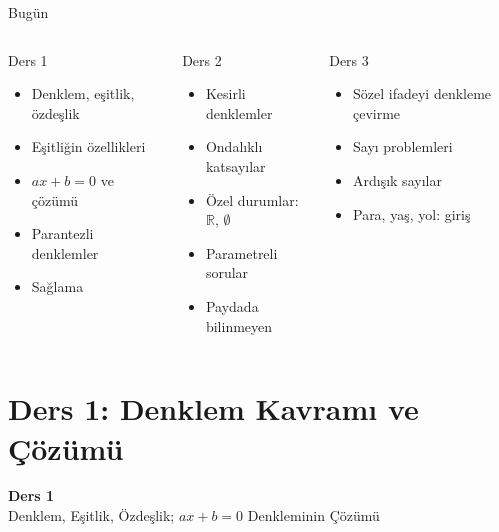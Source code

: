 \documentclass[aspectratio=169,11pt]{beamer}
\begin{document}
\begin{frame}{Bugün}
\begin{columns}[t]
\begin{block}{Ders 1}
\begin{itemize}
\item Denklem, eşitlik, özdeşlik
\item Eşitliğin özellikleri
\item \(ax+b=0\) ve çözümü
\item Parantezli denklemler
\item Sağlama
\end{itemize}
\end{block}
\begin{block}{Ders 2}
\begin{itemize}
\item Kesirli denklemler
\item Ondalıklı katsayılar
\item Özel durumlar: \(\mathbb{R}\), \(\emptyset\)
\item Parametreli sorular
\item Paydada bilinmeyen
\end{itemize}
\end{block}
\begin{block}{Ders 3}
\begin{itemize}
\item Sözel ifadeyi denkleme çevirme
\item Sayı problemleri
\item Ardışık sayılar
\item Para, yaş, yol: giriş
\end{itemize}
\end{block}
\end{columns}
\end{frame}

\section{Ders 1: Denklem Kavramı ve Çözümü}
\begin{frame}
\centering\Large\color{anamavi}\textbf{Ders 1}\\[6pt]\normalsize Denklem, Eşitlik, Özdeşlik; \(ax+b=0\) Denkleminin Çözümü
\end{frame}
\end{document}
